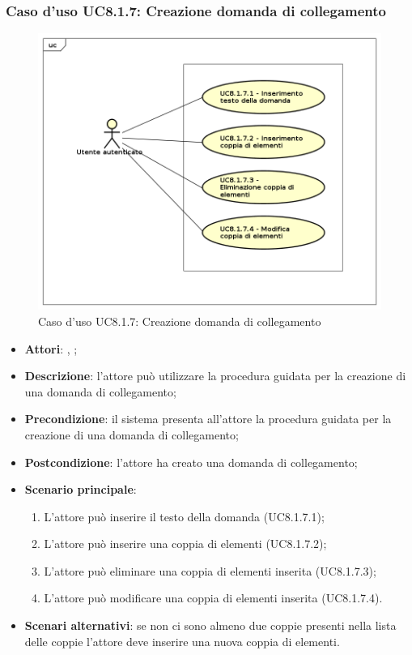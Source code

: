\subsubsection{Caso d'uso UC8.1.7: Creazione domanda di collegamento}
\label{UC8.1.7}
\begin{figure}[h]
	\centering
\includegraphics[scale=0.5,keepaspectratio]{UML/UC8_1_7.png}
	\caption{Caso d'uso UC8.1.7: Creazione domanda di collegamento}
\end{figure}
\FloatBarrier
\begin{itemize}
	\item \textbf{Attori}: \uau, \uaupro;
	\item \textbf{Descrizione}: l'attore può utilizzare la procedura guidata per la creazione di una domanda di collegamento; 
	\item \textbf{Precondizione}: il sistema presenta all'attore la procedura guidata per la creazione di una domanda di collegamento;
	\item \textbf{Postcondizione}: l'attore ha creato una domanda di collegamento;
	\item \textbf{Scenario principale}: 
		\begin{enumerate}
			\item L'attore può inserire il testo della domanda (UC8.1.7.1);
			\item L'attore può inserire una coppia di elementi (UC8.1.7.2);
			\item L'attore può eliminare una coppia di elementi inserita (UC8.1.7.3);
			\item L'attore può modificare una coppia di elementi inserita (UC8.1.7.4).
		\end{enumerate}
	\item \textbf{Scenari alternativi}: se non ci sono almeno due coppie presenti nella lista delle coppie l'attore deve inserire una nuova coppia di elementi.
\end{itemize}

